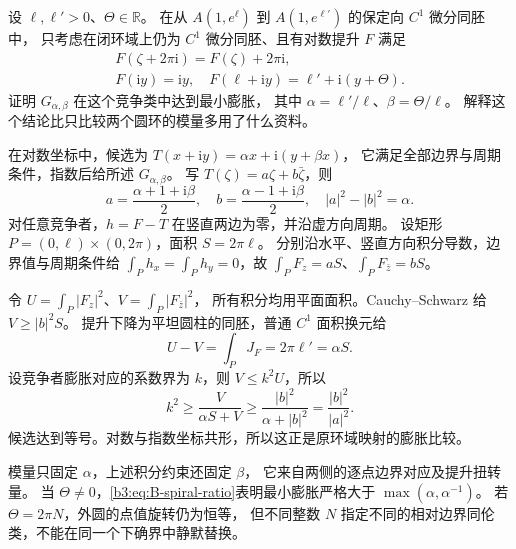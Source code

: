 \begin{exercise}\label{b3:ex:B-5}
设 \(\ell,\ell'>0\)、\(\Theta\in\mathbb R\)。
在从 \(A(1,e^\ell)\) 到 \(A(1,e^{\ell'})\) 的保定向 \(C^1\) 微分同胚中，
只考虑在闭环域上仍为 \(C^1\) 微分同胚、且有对数提升 \(F\) 满足
\[
 \begin{gathered}
 F(\zeta+2\pi\mathrm i)=F(\zeta)+2\pi\mathrm i,\\
 F(\mathrm i y)=\mathrm i y,\quad
 F(\ell+\mathrm i y)=\ell'+\mathrm i(y+\Theta).
 \end{gathered}
\]
证明 \(G_{\alpha,\beta}\) 在这个竞争类中达到最小膨胀，
其中 \(\alpha=\ell'/\ell\)、\(\beta=\Theta/\ell\)。
解释这个结论比只比较两个圆环的模量多用了什么资料。
\end{exercise}
\begin{solution}
在对数坐标中，候选为
\(T(x+\mathrm i y)=\alpha x+\mathrm i(y+\beta x)\)，
它满足全部边界与周期条件，指数后给所述 \(G_{\alpha,\beta}\)。
写 \(T(\zeta)=a\zeta+b\bar\zeta\)，则
\[
 a=\frac{\alpha+1+\mathrm i\beta}{2},\quad
 b=\frac{\alpha-1+\mathrm i\beta}{2},\quad
 |a|^2-|b|^2=\alpha.
\]
对任意竞争者，\(h=F-T\) 在竖直两边为零，并沿虚方向周期。
设矩形 \(P=(0,\ell)\times(0,2\pi)\)，面积 \(S=2\pi\ell\)。
分别沿水平、竖直方向积分导数，边界值与周期条件给
\(\int_P h_x=\int_P h_y=0\)，故
\(\int_P F_z=aS\)、\(\int_P F_{\bar z}=bS\)。

令 \(U=\int_P|F_z|^2\)、\(V=\int_P|F_{\bar z}|^2\)，
所有积分均用平面面积。Cauchy--Schwarz 给 \(V\ge|b|^2S\)。
提升下降为平坦圆柱的同胚，普通 \(C^1\) 面积换元给
\[
 U-V=\int_P J_F=2\pi\ell'=\alpha S.
\]
设竞争者膨胀对应的系数界为 \(k\)，则 \(V\le k^2U\)，所以
\[
 k^2\ge\frac{V}{\alpha S+V}
       \ge\frac{|b|^2}{\alpha+|b|^2}
       =\frac{|b|^2}{|a|^2}.
\]
候选达到等号。对数与指数坐标共形，所以这正是原环域映射的膨胀比较。

模量只固定 \(\alpha\)，上述积分约束还固定 \(\beta\)，
它来自两侧的逐点边界对应及提升扭转量。
当 \(\Theta\ne0\)，\eqref{b3:eq:B-spiral-ratio}表明最小膨胀严格大于
\(\max(\alpha,\alpha^{-1})\)。
若 \(\Theta=2\pi N\)，外圆的点值旋转仍为恒等，
但不同整数 \(N\) 指定不同的相对边界同伦类，不能在同一个下确界中静默替换。
\end{solution}


